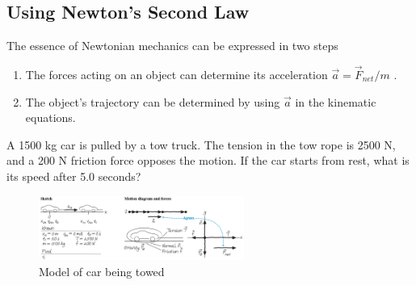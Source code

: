 \subsection{Using Newton's Second Law} The essence of Newtonian
mechanics can be expressed in two steps
\begin{enumerate}
    \item
        The forces acting on an object can determine its acceleration
        $
            \vec{a}=\vec{F}_{net}/m
        $%
        .
    \item
        The object's trajectory can be determined by using
        $
            \vec{a}
        $ in the kinematic equations.
\end{enumerate}
\begin{Exercise}[title={Speed of a towed car}, label={dynamics.2.1},
    origin={Knight}]
    A 1500 kg car is pulled by a tow truck.  The tension in the tow rope
    is 2500 N, and a 200 N friction force opposes the motion.  If the
    car starts from rest, what is its speed after 5.0 seconds?
    \begin{figure}[!htbp]
        \centering
        \includegraphics[width=0.6\textwidth]{../figures/car-towed-pictoral-representation.png}
        \caption{Model of car being towed%
        \label{dynamics.2.2}}
    \end{figure}
\end{Exercise}
